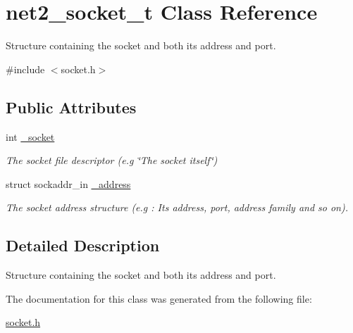 \hypertarget{structnet2__socket__t}{\section{net2\-\_\-socket\-\_\-t Class Reference}
\label{structnet2__socket__t}
}


Structure containing the socket and both its address and port.  




{\ttfamily \#include $<$socket.\-h$>$}

\subsection*{Public Attributes}
\begin{DoxyCompactItemize}
\item 
\hypertarget{structnet2__socket__t_a605421383ca1720f2f46dbc19b4fd101}{int \hyperlink{structnet2__socket__t_a605421383ca1720f2f46dbc19b4fd101}{\-\_\-socket}}\label{structnet2__socket__t_a605421383ca1720f2f46dbc19b4fd101}

\begin{DoxyCompactList}\small\item\em The socket file descriptor (e.\-g \char`\"{}\-The socket itself\char`\"{}) \end{DoxyCompactList}\item 
\hypertarget{structnet2__socket__t_a6527b2540e35955db1187ddee8b75877}{struct sockaddr\-\_\-in \hyperlink{structnet2__socket__t_a6527b2540e35955db1187ddee8b75877}{\-\_\-address}}\label{structnet2__socket__t_a6527b2540e35955db1187ddee8b75877}

\begin{DoxyCompactList}\small\item\em The socket address structure (e.\-g \-: Its address, port, address family and so on). \end{DoxyCompactList}\end{DoxyCompactItemize}


\subsection{Detailed Description}
Structure containing the socket and both its address and port. 

The documentation for this class was generated from the following file\-:\begin{DoxyCompactItemize}
\item 
\hyperlink{socket_8h}{socket.\-h}\end{DoxyCompactItemize}
